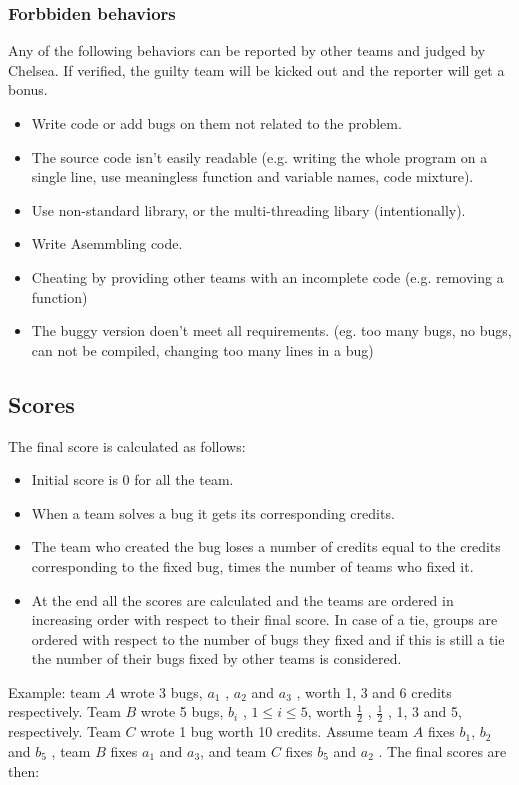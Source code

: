 \documentclass[11pt,a4paper]{article}
\begin{document}
\subsubsection{Forbbiden behaviors}

Any of the following behaviors can be reported by other teams and judged by Chelsea. If verified, the guilty team will be kicked out and the reporter will get a bonus.

\begin{itemize}
	\item Write code or add bugs on them not related to the problem.
	\item The source code isn't easily readable (e.g. writing the whole program on a single line, use meaningless function and variable names, code mixture).
	\item Use non-standard library, or the multi-threading libary (intentionally).
	\item Write Asemmbling code.
	\item Cheating by providing other teams with an incomplete code (e.g. removing a function)
	\item The buggy version doen't meet all requirements. (eg. too many bugs, no bugs, can not be compiled, changing too many lines in a bug)
\end{itemize}

\subsection{Scores}

The final score is calculated as follows:
\begin{itemize}
	\item Initial score is 0 for all the team.
	\item When a team solves a bug it gets its corresponding credits.
	\item The team who created the bug loses a number of credits equal to the credits corresponding to the
	fixed bug, times the number of teams who fixed it.
	\item At the end all the scores are calculated and the teams are ordered in increasing order with respect
	to their final score. In case of a tie, groups are ordered with respect to the number of bugs they
	fixed and if this is still a tie the number of their bugs fixed by other teams is considered.
\end{itemize}

Example: team $A$ wrote 3 bugs, $a_1$ , $a_2$ and $a_3$ , worth 1, 3 and 6 credits respectively. Team $B$ wrote 5
bugs, $b_i$ , $1 \leqslant i \leqslant 5$, worth $\frac{1}{2}$ , $\frac{1}{2}$ , 1, 3 and 5, respectively. Team $C$ wrote 1 bug worth 10 credits. Assume
team $A$ fixes $b_1$, $b_2$ and $b_5$ , team $B$ fixes $a_1$ and $a_3$, and team $C$ fixes $b_5$ and $a_2$ . The final scores are
then:
\end{document}
